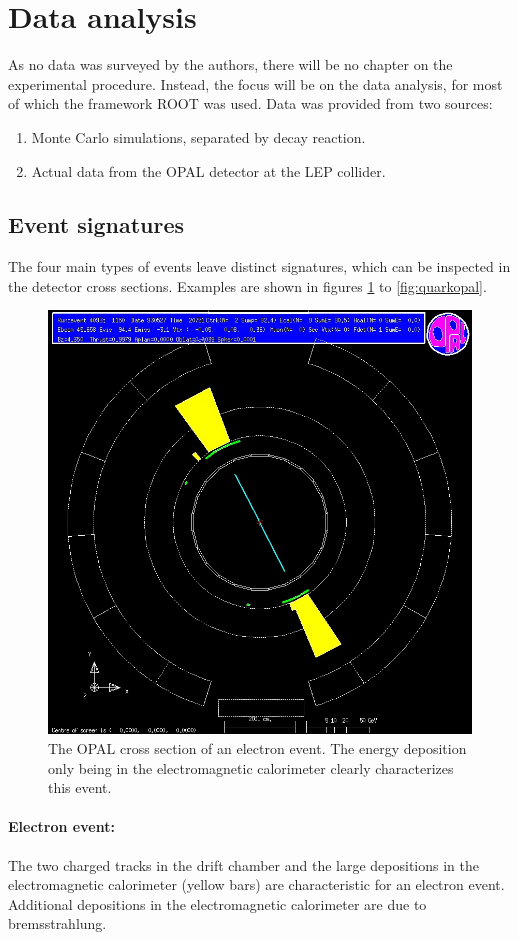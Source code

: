\section{Data analysis}
As no data was surveyed by the authors, there will be no chapter on the experimental procedure. Instead, the focus will be on the data analysis, for most of which the framework ROOT was used. Data was provided from two sources:
\begin{enumerate}
	\item Monte Carlo simulations, separated by decay reaction.
	\item Actual data from the OPAL detector at the LEP collider.
\end{enumerate}

\subsection{Event signatures}
The four main types of events leave distinct signatures, which can be inspected in the detector cross sections. Examples are shown in figures \ref{fig:electronopal} to \ref{fig:quarkopal}. 

\begin{figure}[H]
\centering
\includegraphics[width=0.75\linewidth]{graphics/electronopal}
\caption[OPAL cross secion electron event]{The OPAL cross section of an electron event. The energy deposition only being in the electromagnetic calorimeter clearly characterizes this event. \cite{cern}}
\label{fig:electronopal}
\end{figure}
\paragraph{Electron event:} The two charged tracks in the drift chamber and the large depositions in the electromagnetic calorimeter (yellow bars) are characteristic for an electron event. Additional depositions in the electromagnetic calorimeter are due to bremsstrahlung.

